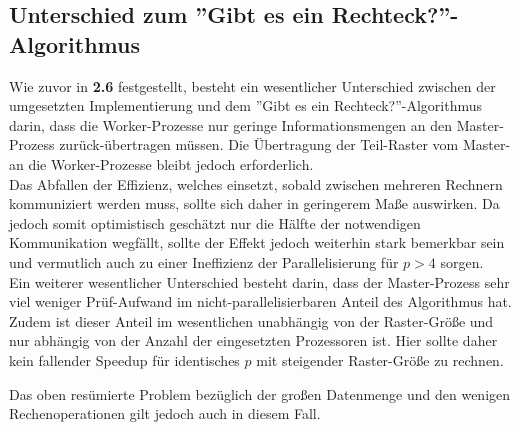 \documentclass[
10pt, %
a4paper, %
oneside, %
headinclude,footinclude, %
BCOR5mm, %
]{scrartcl}
\begin{document}
\subsection{Unterschied zum ''Gibt es ein Rechteck?''-Algorithmus}
Wie zuvor in \textbf{2.6} festgestellt, besteht ein wesentlicher Unterschied zwischen der umgesetzten Implementierung und dem ''Gibt es ein Rechteck?''-Algorithmus darin, dass die Worker-Prozesse nur geringe Informationsmengen an den Master-Prozess zurück-übertragen müssen. Die Übertragung der Teil-Raster vom Master- an die Worker-Prozesse bleibt jedoch erforderlich.\\
Das Abfallen der Effizienz, welches einsetzt, sobald zwischen mehreren Rechnern kommuniziert werden muss, sollte sich daher in geringerem Maße auswirken. Da jedoch somit optimistisch geschätzt nur die Hälfte der notwendigen Kommunikation wegfällt, sollte der Effekt jedoch weiterhin stark bemerkbar sein und vermutlich auch zu einer Ineffizienz der Parallelisierung für \(p>4\) sorgen.\\

Ein weiterer wesentlicher Unterschied besteht darin, dass der Master-Prozess sehr viel weniger Prüf-Aufwand im nicht-parallelisierbaren Anteil des Algorithmus hat. Zudem ist dieser Anteil im wesentlichen unabhängig von der Raster-Größe und nur abhängig von der Anzahl der eingesetzten Prozessoren ist. Hier sollte daher kein fallender Speedup für identisches \(p\) mit steigender Raster-Größe zu rechnen.

Das oben resümierte Problem bezüglich der großen Datenmenge und den wenigen Rechenoperationen gilt jedoch auch in diesem Fall.
\end{document}
